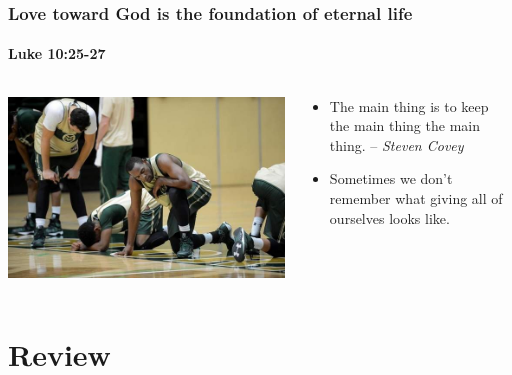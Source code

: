 \begin{frame}
	\frametitle{Love toward God is the foundation of eternal life}
	\framesubtitle{Luke 10:25-27}
	\begin{columns}
	\begin{column}{0.5\textwidth}
		\includegraphics[width=\columnwidth]{figures/basketballRunning.jpg}
	\end{column}
	\begin{column}{0.5\textwidth}
		\begin{itemize}
			\item The main thing is to keep the main thing the main thing. -- {\footnotesize \emph{Steven Covey}}
			\item Sometimes we don't remember what giving all of ourselves looks like.
		\end{itemize}
	\end{column}
	\end{columns}
\end{frame}

\section{Review}

